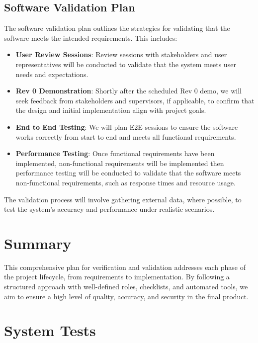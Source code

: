 \documentclass[12pt, titlepage]{article}
\begin{document}
\subsection{Software Validation Plan}

The software validation plan outlines the strategies for validating that the software meets the intended requirements. This includes:

\begin{itemize}
    \item \textbf{User Review Sessions}: Review sessions with stakeholders and user representatives will be conducted to validate that the system meets user needs and expectations.
    \item \textbf{Rev 0 Demonstration}: Shortly after the scheduled Rev 0 demo, we will seek feedback from stakeholders and supervisors, if applicable, to confirm that the design and initial implementation align with project goals.
    \item \textbf{End to End Testing}: We will plan E2E sessions to ensure the software works correctly from start to end and meets all functional requirements.
    \item \textbf{Performance Testing}: Once functional requirements have been implemented, non-functional requirements will be implemented then performance testing will be conducted to validate that the software meets non-functional requirements, such as response times and resource usage.
\end{itemize}

The validation process will involve gathering external data, where possible, to test the system’s accuracy and performance under realistic scenarios.

\section*{Summary}

This comprehensive plan for verification and validation addresses each phase of the project lifecycle, from requirements to implementation. By following a structured approach with well-defined roles, checklists, and automated tools, we aim to ensure a high level of quality, accuracy, and security in the final product.

\section{System Tests}

\end{document}
